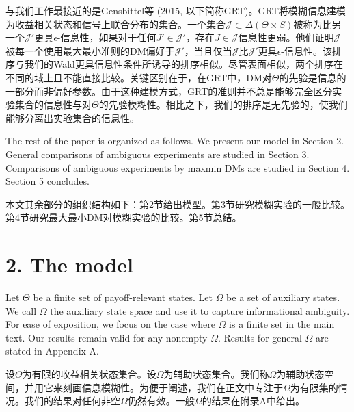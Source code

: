 \documentclass[12pt,a4paper]{article}
\newenvironment{original}
  {\par\vspace{4pt}\noindent\color{black}\ignorespaces}
  {\par\vspace{2pt}}
\newenvironment{translation}
  {\par\vspace{2pt}\noindent\color{myblue}\ignorespaces}
  {\par\vspace{6pt}}
\newcommand{\bisection}[2]{%
  \section{#1}%
  \vspace{-2pt}%
  \noindent{\color{myblue}\large\bfseries #2}%
  \vspace{6pt}%
}
\newcommand{\Delt}{\Delta}
\begin{document}
\begin{translation}
与我们工作最接近的是Gensbittel等 (2015, 以下简称GRT)。GRT将模糊信息建模为收益相关状态和信号上联合分布的集合。一个集合$\mathcal{J}\subset\Delt(\Theta\times S)$被称为比另一个$\mathcal{J}'$更具$\epsilon$-信息性，如果对于任何$J'\in\mathcal{J}'$，存在$J\in\mathcal{J}$信息性更弱。他们证明$\mathcal{J}$被每一个使用最大最小准则的DM偏好于$\mathcal{J}'$，当且仅当$\mathcal{J}$比$\mathcal{J}'$更具$\epsilon$-信息性。该排序与我们的Wald更具信息性条件所诱导的排序相似。尽管表面相似，两个排序在不同的域上且不能直接比较。关键区别在于，在GRT中，DM对$\Theta$的先验是信息的一部分而非偏好参数。由于这种建模方式，GRT的准则并不总是能够完全区分实验集合的信息性与对$\Theta$的先验模糊性。相比之下，我们的排序是无先验的，使我们能够分离出实验集合的信息性。
\end{translation}

\begin{original}
The rest of the paper is organized as follows. We present our model in Section 2. General comparisons of ambiguous experiments are studied in Section 3. Comparisons of ambiguous experiments by maxmin DMs are studied in Section 4. Section 5 concludes.
\end{original}

\begin{translation}
本文其余部分的组织结构如下：第2节给出模型。第3节研究模糊实验的一般比较。第4节研究最大最小DM对模糊实验的比较。第5节总结。
\end{translation}


\bisection{2. The model}{2. 模型}

\begin{original}
Let $\Theta$ be a finite set of payoff-relevant states. Let $\Omega$ be a set of auxiliary states. We call $\Omega$ the auxiliary state space and use it to capture informational ambiguity. For ease of exposition, we focus on the case where $\Omega$ is a finite set in the main text. Our results remain valid for any nonempty $\Omega$. Results for general $\Omega$ are stated in Appendix A.
\end{original}

\begin{translation}
设$\Theta$为有限的收益相关状态集合。设$\Omega$为辅助状态集合。我们称$\Omega$为辅助状态空间，并用它来刻画信息模糊性。为便于阐述，我们在正文中专注于$\Omega$为有限集的情况。我们的结果对任何非空$\Omega$仍然有效。一般$\Omega$的结果在附录A中给出。
\end{translation}
\end{document}
